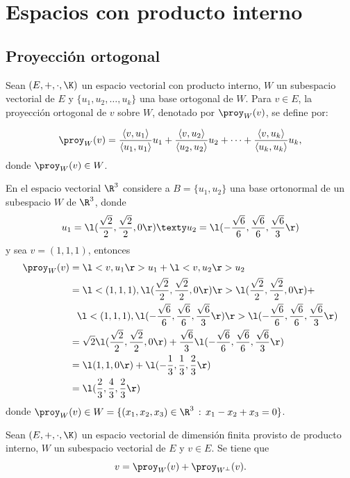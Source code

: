 \documentclass[compacto,10pt]{pubciencias-notas}
\begin{document}
\encabezado
\vspace*{-8mm}

\setcounter{section}{4}
\section{Espacios con producto interno}
\setcounter{subsection}{2}
\subsection{Proyección ortogonal}
\setcounter{defi}{8}
\begin{defi}
Sean $(E,+,\cdot,\K)$ un espacio vectorial con producto interno, 
$W$ un subespacio vectorial de $E$ y  $\{u_1, u_2, \ldots, u_k \}$ una base ortogonal de $W$. Para $v \in E$, la proyección ortogonal de $v$ sobre $W$, denotado por $\proy_W (v)$, se define por:

\[   \proy_W(v) = \dfrac{\left<v,u_1 \right>}{\left<u_1, u_1 \right\rangle }u_1 +
   \dfrac{\left<v,u_2 \right\rangle}{\left<u_2, u_2 \right\rangle}u_2 +
   \cdots +
   \dfrac{\left<v,u_k \right\rangle}{\left<u_k, u_k \right\rangle}u_k,
\]
donde $\proy_W (v) \in W$.
\end{defi}
\begin{ejem}\hspace{0pt}\label{ProyeccionOrtogonal} En el espacio vectorial $\R^{3}$ considere a $B=\{u_1, u_2\}$ una base ortonormal de un subespacio $W$ de $\R^3$, donde
\[
    u_1 = \l(\dfrac{\sqrt{2}}{2},\dfrac{\sqrt{2}}{2},0\r)
    \texty
    u_2 = \l(- \dfrac{\sqrt{6}}{6},\dfrac{\sqrt{6}}{6}, \dfrac{\sqrt{6}}{3}\r)
\]
y sea $v = (1,1,1)$, entonces
\begin{align*}
\proy_W(v)
&= \l<v, u_1\r> u_1 + \l<v, u_2\r> u_2\\
&= \l<(1, 1, 1), \l(\dfrac{\sqrt{2}}{2},\dfrac{\sqrt{2}}{2},0\r)\r> \l(\dfrac{\sqrt{2}}{2},\dfrac{\sqrt{2}}{2},0\r) +\\
&\phantom{= } \l<(1, 1, 1), 
\l(- \dfrac{\sqrt{6}}{6},\dfrac{\sqrt{6}}{6}, \dfrac{\sqrt{6}}{3}\r)\r> \l(- \dfrac{\sqrt{6}}{6},\dfrac{\sqrt{6}}{6}, \dfrac{\sqrt{6}}{3}\r)\\
&= \sqrt{2}\l(\dfrac{\sqrt{2}}{2},\dfrac{\sqrt{2}}{2},0\r) + \dfrac{\sqrt{6}}{3} 
\l(- \dfrac{\sqrt{6}}{6},\dfrac{\sqrt{6}}{6}, \dfrac{\sqrt{6}}{3}\r)\\
&= \l(1, 1, 0\r) + \l(- \dfrac{1}{3}, \dfrac{1}{3}, \dfrac{2}{3}\r)\\
&= \l(\dfrac{2}{3}, \dfrac{4}{3}, \dfrac{2}{3}\r)
\end{align*}
donde $\proy_W(v) \in W = \{(x_{1}, x_{2}, x_{3})\in\R^{3}\,:\,x_{1} - x_{2} + x_{3} = 0\}$.
\end{ejem}
\begin{teo}\label{TeoProyec}
Sean $(E,+,\cdot,\K)$ un espacio vectorial de dimensión finita provisto de producto interno, $W$ un subespacio vectorial de $E$ y $v \in E$. Se tiene que
\[
    v = \proy_W( v) + \proy_{W^\perp}( v).
\]
\end{teo}
\end{document}

